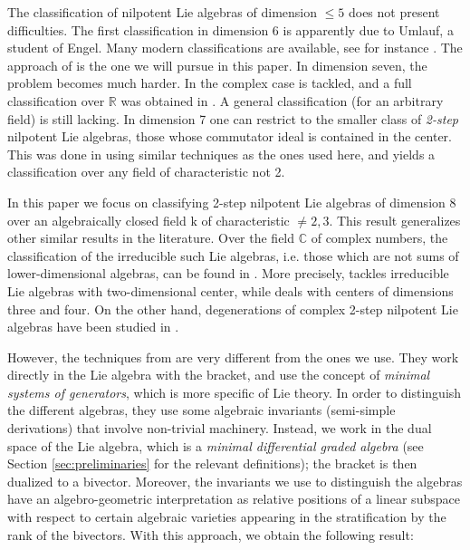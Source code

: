 \documentclass[10pt,reqno]{amsart}
\newcommand{\CC}{\mathbb{C}}
\newcommand{\RR}{\mathbb{R}}
\newcommand{\kk}{\mathrm{k}}
\theoremstyle{definition}
\begin{document}
The classification of nilpotent Lie algebras of dimension $\leq 5$ does not present difficulties. The first classification in dimension 6 is apparently due to Umlauf, a student of Engel. Many modern classifications are available, see for instance \cite{B-M,Cicalo,deGraaf,Magnin,Morozov}. The approach of \cite{B-M} is the one we will pursue in this paper. In dimension seven, the problem becomes much harder. In \cite{Seeley} the complex case is tackled, and a full classification over $\RR$ was obtained in \cite{Gong}. A general classification (for an arbitrary field) is still lacking. In dimension 7 one can restrict to the smaller class of {\em 2-step} nilpotent Lie algebras, those whose commutator ideal is contained in the center. This was done in \cite{B} using similar techniques as the ones used here, and yields a classification over any field of characteristic not 2.

In this paper we focus on classifying 2-step nilpotent Lie algebras of dimension $8$ over an algebraically closed field $\kk$ of characteristic $\ne 2, 3$. This result generalizes other similar results in the literature. Over the field $\CC$ of complex numbers, the classification of the irreducible such Lie algebras, i.e. those which are not sums of lower-dimensional algebras, can be found in \cite{Ren2011,Yan}. More precisely, \cite{Ren2011} tackles irreducible Lie algebras with two-dimensional center, while \cite{Yan} deals with centers of dimensions three and four. On the other hand, degenerations of complex 2-step nilpotent Lie algebras have been studied in \cite{Alvarez}.

However, the techniques from \cite{Ren2011,Yan} are very different from the ones we use. They work directly in the Lie algebra with the bracket, and use the concept of {\em minimal systems of generators}, which is more specific of Lie theory. In order to distinguish the different algebras, they use some algebraic invariants (semi-simple derivations) that involve non-trivial machinery.
Instead, we work in the dual space of the Lie algebra, which is a {\em minimal differential graded algebra} (see Section \ref{sec:preliminaries} for the relevant definitions); the bracket is then dualized to a bivector. Moreover, the invariants we use to distinguish the algebras have an algebro-geometric interpretation as relative positions of a linear subspace with respect to certain algebraic varieties appearing in the stratification by the rank of the bivectors. With this approach, we obtain the following result:
\end{document}
